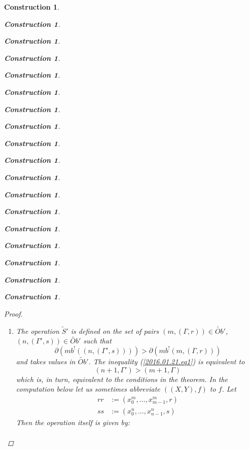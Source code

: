 \documentclass[12pt]{amsart}
\numberwithin{proposition}{subsection}
\newtheorem{construction}[proposition]{Construction}
\newcommand{\llabel}[1]{\label{#1}}
\newcommand{\wt}{\widetilde}
\newcommand{\wh}{\widehat}
\newcommand{\spc}{{\,\,\,\,\,\,\,}}
\begin{document}
\begin{construction}
\begin{construction}
\begin{construction}
\begin{construction}
\begin{construction}
\begin{construction}
\begin{construction}
\begin{construction}
\begin{construction}
\begin{construction}
\begin{construction}
\begin{construction}
\begin{construction}
\begin{construction}
\begin{construction}
\begin{construction}
\begin{construction}
\begin{construction}
\begin{proof}
\begin{enumerate}
where $A=(m+1,\Gamma)$, $B=(n,\Gamma')$ and $i=n-m-1$. To apply Lemma
\ref{2016.01.31.l1} we should take $X=\wh{m}$, $lx=m$ and $Y=\wh{n}$, $ly=n$,
and $$f=((ft(A),A),(x^{m}_0,\dots,x^{m}_{m-1},r)).$$  Let further
$rr=(x^{m}_0,\dots,x^{m}_{m-1},r)$. Then we can extend these equalities as
follows.
%
\begin{equation*}
  \begin{split}
    f^*&((n,\Gamma'),i)
    \\&=
    (rr^*(\wh{n},i),(T_0,\dots,T_{m-1},
    \\& \spc\spc\spc\spc
    q(rr,ft^i(\wh{n}),0)(T'_{m+1}),\dots,q(rr,ft(\wh{n}),i-1)(T'_{n-1})))
    \\&=
    (n-1,(T_0,\dots,T_{m-1},
    \\& \spc\spc\spc\spc
    rr(T'_{m+1}),\dots,qq^{n-m-2}(rr)(T'_{n-1})))
    \\&=
    (n-1,(T_0',\dots,T_{m-1}',
    \\& \spc\spc\spc\spc
    rr(T_{m+1}'),qq(rr)(T_{m+2}'),\dots,qq^{n-m-2}(rr)(T_{n-1}'))),
  \end{split}
\end{equation*}
%
where the last equality holds by the assumption that $T_i=T_i'$ for $i=0,\dots,m$. 
The required formula follows from the equality 
%
$$qq^j(rr)(T_{m+j+1}')=\theta_{m,m+j+1}(r,T_{m+j+1}').$$
%
\item The operation $\wt{S}'$ is defined on the set of pairs $(m,(\Gamma,r))\in \wt{Ob}'$, $(n,(\Gamma',s))\in \wt{Ob}'$ such that 
%
\begin{equation}\llabel{2016.01.21.eq1}
\partial(mb^!((n,(\Gamma',s))))>\partial(mb^!(m,(\Gamma,r)))
\end{equation}%
%
and takes values in $\wt{Ob}'$. The inequality (\ref{2016.01.21.eq1}) is equivalent to 
%
$$(n+1,\Gamma')>(m+1,\Gamma)$$
%
which is, in turn, equivalent to the conditions in the theorem. In the computation  below let us sometimes abbreviate $((X,Y),f)$ to $f$. Let
%
\begin{equation*}
  \begin{split}
    rr&:=(x_0^m,\dots,x_{m-1}^m,r)\\
    ss&:=(x_0^n,\dots,x_{n-1}^n,s)
  \end{split}
\end{equation*}
%
Then the operation itself is given by:
\begin{equation*}
  \begin{split}

\end{split}
\end{equation*}
\end{enumerate}
\end{proof}
\end{construction}
\end{construction}
\end{construction}
\end{construction}
\end{construction}
\end{construction}
\end{construction}
\end{construction}
\end{construction}
\end{construction}
\end{construction}
\end{construction}
\end{construction}
\end{construction}
\end{construction}
\end{construction}
\end{construction}
\end{construction}
\end{document}
